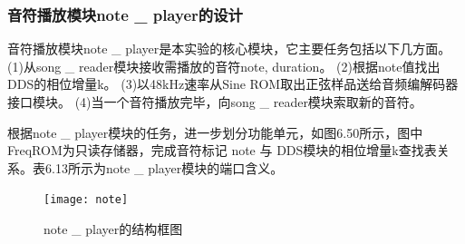 \documentclass{../source/Experiment}
\begin{document}
            \subsubsection{音符播放模块note \_ player的设计}

                音符播放模块note \_ player是本实验的核心模块，它主要任务包括以下几方面。
                (1)从song \_ reader模块接收需播放的音符{note, duration}。
                (2)根据note值找出 DDS的相位增量k。
                (3)以48kHz速率从Sine ROM取出正弦样品送给音频编解码器接口模块。
                (4)当一个音符播放完毕，向song \_ reader模块索取新的音符。
                
                根据note \_ player模块的任务，进一步划分功能单元，如图6.50所示，图中FreqROM为只读存储器，完成音符标记 note 与 DDS模块的相位增量k查找表关系。表6.13所示为note \_ player模块的端口含义。

                \begin{figure}[H]
                    \centering
                    \texttt{[image: note]}
                    \caption{note \_ player的结构框图}
                \end{figure}
\end{document}
